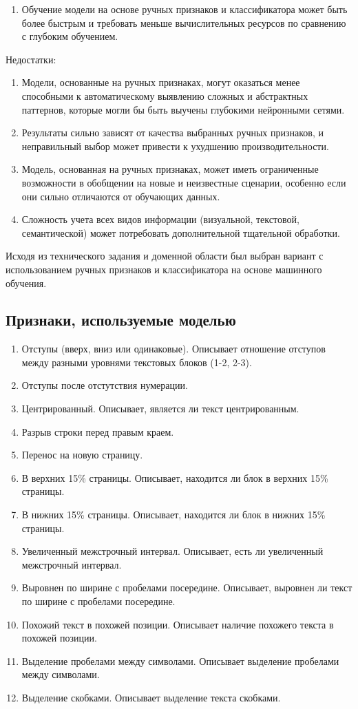 \begin{enumerate}
\begin{enumerate}
  \item Обучение модели на основе ручных признаков и классификатора может быть более быстрым и требовать меньше вычислительных ресурсов по сравнению с глубоким обучением.
   \end{enumerate}
  Недостатки:
  \begin{enumerate}
  \item Модели, основанные на ручных признаках, могут оказаться менее способными к автоматическому выявлению сложных и абстрактных паттернов, которые могли бы быть выучены глубокими нейронными сетями.
  \item Результаты сильно зависят от качества выбранных ручных признаков, и неправильный выбор может привести к ухудшению производительности.
  \item Модель, основанная на ручных признаках, может иметь ограниченные возможности в обобщении на новые и неизвестные сценарии, особенно если они сильно отличаются от обучающих данных.
  \item Сложность учета всех видов информации (визуальной, текстовой, семантической) может потребовать дополнительной тщательной обработки.
    \end{enumerate}
\end{enumerate}

Исходя из технического задания и доменной области был выбран вариант с использованием ручных признаков и классификатора на основе машинного обучения.

\subsection{Признаки, используемые моделью}

\begin{enumerate}
\item Отступы (вверх, вниз или одинаковые). Описывает отношение отступов между разными уровнями текстовых блоков (1-2, 2-3).
\item Отступы после отстутствия нумерации.
\item Центрированный. Описывает, является ли текст центрированным.
\item Разрыв строки перед правым краем.
\item Перенос на новую страницу.
\item В верхних 15\% страницы.    Описывает, находится ли блок в верхних 15\% страницы.
\item В нижних 15\% страницы.    Описывает, находится ли блок в нижних 15\% страницы.
\item Увеличенный межстрочный интервал. Описывает, есть ли увеличенный межстрочный интервал.
\item Выровнен по ширине с пробелами посередине. Описывает, выровнен ли текст по ширине с пробелами посередине.
\item Похожий текст в похожей позиции. Описывает наличие похожего текста в похожей позиции.
\item Выделение пробелами между символами. Описывает выделение пробелами между символами.
\item Выделение скобками. Описывает выделение текста скобками.
\end{enumerate}
